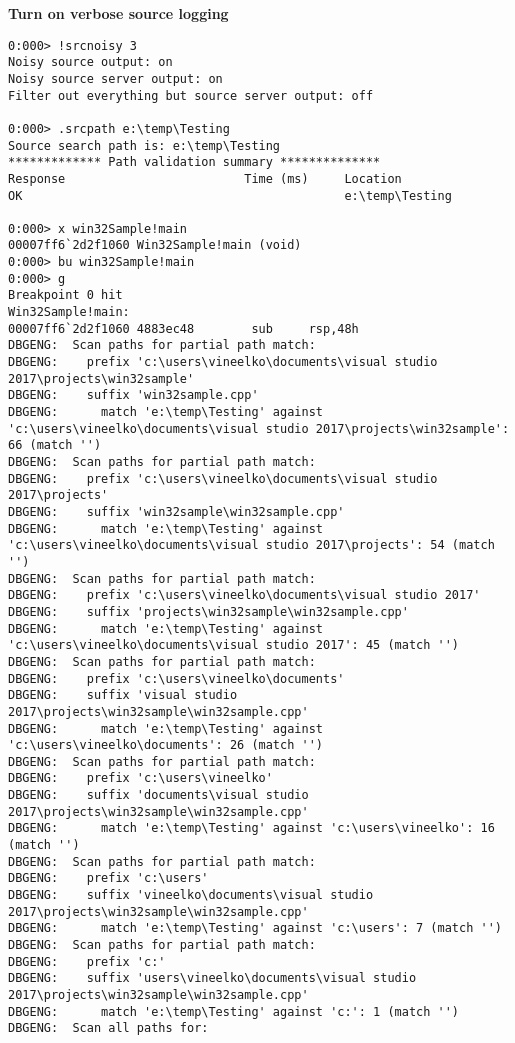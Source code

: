 \documentclass{article}
\begin{document}
\textbf{Turn on verbose source logging}
\begin{verbatim}
0:000> !srcnoisy 3
Noisy source output: on
Noisy source server output: on
Filter out everything but source server output: off

0:000> .srcpath e:\temp\Testing
Source search path is: e:\temp\Testing
************* Path validation summary **************
Response                         Time (ms)     Location
OK                                             e:\temp\Testing

0:000> x win32Sample!main
00007ff6`2d2f1060 Win32Sample!main (void)
0:000> bu win32Sample!main
0:000> g
Breakpoint 0 hit
Win32Sample!main:
00007ff6`2d2f1060 4883ec48        sub     rsp,48h
DBGENG:  Scan paths for partial path match:
DBGENG:    prefix 'c:\users\vineelko\documents\visual studio 2017\projects\win32sample'
DBGENG:    suffix 'win32sample.cpp'
DBGENG:      match 'e:\temp\Testing' against 'c:\users\vineelko\documents\visual studio 2017\projects\win32sample': 66 (match '')
DBGENG:  Scan paths for partial path match:
DBGENG:    prefix 'c:\users\vineelko\documents\visual studio 2017\projects'
DBGENG:    suffix 'win32sample\win32sample.cpp'
DBGENG:      match 'e:\temp\Testing' against 'c:\users\vineelko\documents\visual studio 2017\projects': 54 (match '')
DBGENG:  Scan paths for partial path match:
DBGENG:    prefix 'c:\users\vineelko\documents\visual studio 2017'
DBGENG:    suffix 'projects\win32sample\win32sample.cpp'
DBGENG:      match 'e:\temp\Testing' against 'c:\users\vineelko\documents\visual studio 2017': 45 (match '')
DBGENG:  Scan paths for partial path match:
DBGENG:    prefix 'c:\users\vineelko\documents'
DBGENG:    suffix 'visual studio 2017\projects\win32sample\win32sample.cpp'
DBGENG:      match 'e:\temp\Testing' against 'c:\users\vineelko\documents': 26 (match '')
DBGENG:  Scan paths for partial path match:
DBGENG:    prefix 'c:\users\vineelko'
DBGENG:    suffix 'documents\visual studio 2017\projects\win32sample\win32sample.cpp'
DBGENG:      match 'e:\temp\Testing' against 'c:\users\vineelko': 16 (match '')
DBGENG:  Scan paths for partial path match:
DBGENG:    prefix 'c:\users'
DBGENG:    suffix 'vineelko\documents\visual studio 2017\projects\win32sample\win32sample.cpp'
DBGENG:      match 'e:\temp\Testing' against 'c:\users': 7 (match '')
DBGENG:  Scan paths for partial path match:
DBGENG:    prefix 'c:'
DBGENG:    suffix 'users\vineelko\documents\visual studio 2017\projects\win32sample\win32sample.cpp'
DBGENG:      match 'e:\temp\Testing' against 'c:': 1 (match '')
DBGENG:  Scan all paths for:

\end{verbatim}
\end{document}
